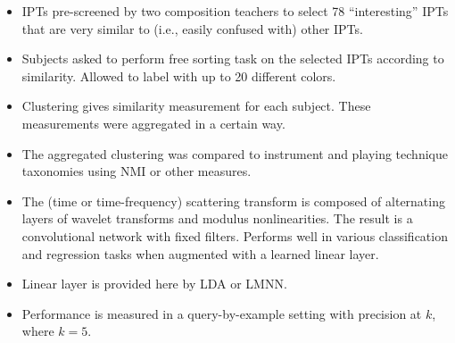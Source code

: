 \documentclass{article}
\begin{document}
\begin{itemize}
\item IPTs pre-screened by two composition teachers to select 78 ``interesting'' IPTs that are very similar to (i.e., easily confused with) other IPTs.
\item Subjects asked to perform free sorting task on the selected IPTs according to similarity. Allowed to label with up to 20 different colors.
\item Clustering gives similarity measurement for each subject. These measurements were aggregated in a certain way.
\item The aggregated clustering was compared to instrument and playing technique taxonomies using NMI or other measures.
\item The (time or time-frequency) scattering transform is composed of alternating layers of wavelet transforms and modulus nonlinearities. The result is a convolutional network with fixed filters. Performs well in various classification and regression tasks when augmented with a learned linear layer.
\item Linear layer is provided here by LDA or LMNN.
\item Performance is measured in a query-by-example setting with precision at $k$, where $k = 5$.
\end{itemize}




\end{document}
